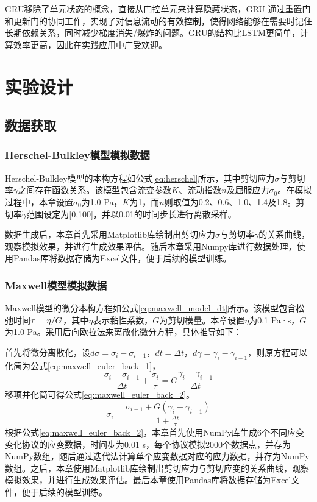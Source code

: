 GRU移除了单元状态的概念，直接从门控单元来计算隐藏状态，GRU 通过重置门和更新门的协同工作，实现了对信息流动的有效控制，使得网络能够在需要时记住长期依赖关系，同时减少梯度消失/爆炸的问题。GRU的结构比LSTM更简单，计算效率更高，因此在实践应用中广受欢迎。

\section{实验设计}
\subsection{数据获取}
\subsubsection{Herschel-Bulkley模型模拟数据}
Herschel-Bulkley模型的本构方程如公式\eqref{eq:herschel}所示，其中剪切应力$\sigma$与剪切率$\dot{\gamma}$之间存在函数关系。该模型包含流变参数$K$、流动指数$n$及屈服应力$\sigma_0$。在模拟过程中，本章设置$\sigma_0$为1.0 Pa，$K$为1，而$n$则取值为0.2、0.6、1.0、1.4及1.8。剪切率$\dot{\gamma}$范围设定为[0,100]，并以0.01的时间步长进行离散采样。

数据生成后，本章首先采用Matplotlib库绘制出剪切应力$\sigma$与剪切率$\dot{\gamma}$的关系曲线，观察模拟效果，并进行生成效果评估。随后本章采用Numpy库进行数据处理，使用Pandas库将数据存储为Excel文件，便于后续的模型训练。
\subsubsection{Maxwell模型模拟数据}
Maxwell模型的微分本构方程如公式\eqref{eq:maxwell_model_dt}所示。该模型包含松弛时间$\tau=\eta/\\G$，其中$\eta$表示黏性系数，$G$为剪切模量。本章设置$\eta$为0.1 Pa·s，$G$为1.0 Pa。采用后向欧拉法来离散化微分方程，具体推导如下：

首先将微分离散化，设$d\sigma=\sigma_i - \sigma_{i-1}$，$dt=\Delta t$，$d\gamma=\gamma_i - \gamma_{i-1}$，则原方程可以化简为公式\eqref{eq:maxwell_euler_back_1}，
\begin{equation}
  \frac{\sigma_i - \sigma_{i-1}}{\Delta t} + \frac{\sigma_i}{\tau} = G \frac{\gamma_i - \gamma_{i-1}}{\Delta t} \label{eq:maxwell_euler_back_1}
\end{equation}
移项并化简可得公式\eqref{eq:maxwell_euler_back_2}。
\begin{equation}
  \sigma_i = \frac{\sigma_{i-1} + G (\gamma_i - \gamma_{i-1})}{1 + \frac{\Delta t}{\tau}} \label{eq:maxwell_euler_back_2}
\end{equation}
根据公式\eqref{eq:maxwell_euler_back_2}，本章首先使用NumPy库生成6个不同应变变化协议的应变数据，时间步为0.01 s，每个协议模拟2000个数据点，并存为NumPy数组，随后通过迭代法计算单个应变数据对应的应力数据，并存为NumPy数组。之后，本章使用Matplotlib库绘制出剪切应力与剪切应变的关系曲线，观察模拟效果，并进行生成效果评估。最后本章使用Pandas库将数据存储为Excel文件，便于后续的模型训练。
